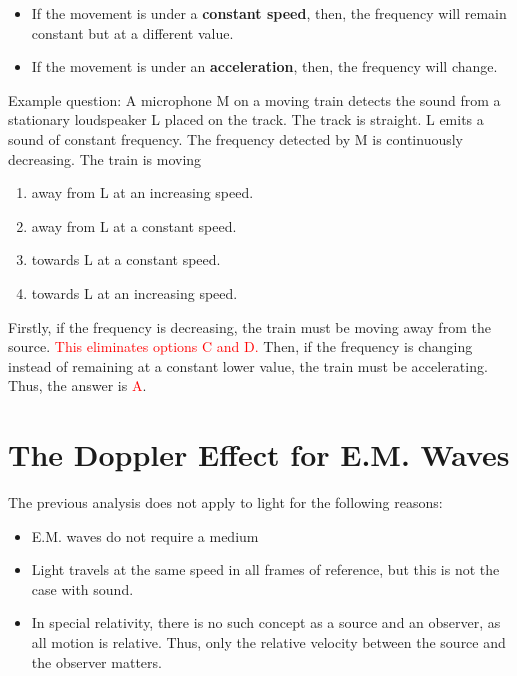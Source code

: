 \documentclass[a4paper,12pt]{article}
\let\oldsection\section
\renewcommand\section{\clearpage\oldsection}
\begin{document}
\begin{itemize}
  \item If the movement is under a \textbf{constant speed}, then, the frequency will remain constant but at a different value.
  \item If the movement is under an \textbf{acceleration}, then, the frequency will change.
\end{itemize}

Example question: A microphone M on a moving train detects the sound from a stationary loudspeaker L placed on the track. The track is straight. L emits a sound of constant frequency. The frequency detected by M is continuously decreasing. The train is moving

\begin{enumerate}[label=\Alph*.]
  \item away from L at an increasing speed.
  \item away from L at a constant speed.
  \item towards L at a constant speed.
  \item towards L at an increasing speed.
\end{enumerate}

Firstly, if the frequency is decreasing, the train must be moving away from the source. \textcolor{red}{This eliminates options C and D.} Then, if the frequency is changing instead of remaining at a constant lower value, the train must be accelerating. Thus, the answer is \textcolor{red}{A}.

\section{The Doppler Effect for E.M. Waves}

The previous analysis does not apply to light for the following reasons:
\begin{itemize}
  \item E.M. waves do not require a medium
  \item Light travels at the same speed in all frames of reference, but this is not the case with sound.
  \item In special relativity, there is no such concept as a source and an observer, as all motion is relative. Thus, only the relative velocity between the source and the observer matters.
\end{itemize}
\end{document}
